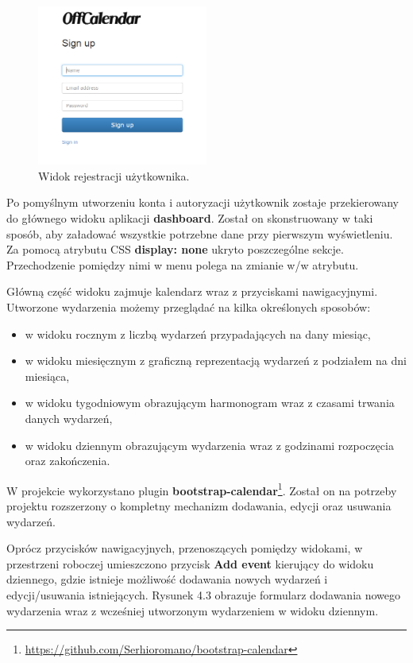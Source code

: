 \begin{figure}[H]
\centering
\includegraphics[width=0.5\textwidth]{register.png}
\caption{Widok rejestracji użytkownika.}
\end{figure}

Po pomyślnym utworzeniu konta i autoryzacji użytkownik zostaje przekierowany do głównego widoku aplikacji \textbf{dashboard}. Został on skonstruowany w taki sposób, aby załadować wszystkie potrzebne dane przy pierwszym wyświetleniu. Za pomocą atrybutu CSS \textbf{display: none} ukryto poszczególne sekcje. Przechodzenie pomiędzy nimi w menu polega na zmianie w/w atrybutu.

Główną część widoku zajmuje kalendarz wraz z przyciskami nawigacyjnymi. Utworzone wydarzenia możemy przeglądać na kilka określonych sposobów:

\begin{itemize}
\item w widoku rocznym z liczbą wydarzeń przypadających na dany miesiąc,
\item w widoku miesięcznym z graficzną reprezentacją wydarzeń z podziałem na dni miesiąca,
\item w widoku tygodniowym obrazującym harmonogram wraz z czasami trwania danych wydarzeń,
\item w widoku dziennym obrazującym wydarzenia wraz z godzinami rozpoczęcia oraz zakończenia.
\end{itemize}

W projekcie wykorzystano plugin \textbf{bootstrap-calendar}\footnote{\url{https://github.com/Serhioromano/bootstrap-calendar}}. Został on na potrzeby projektu rozszerzony o kompletny mechanizm dodawania, edycji oraz usuwania wydarzeń.

Oprócz przycisków nawigacyjnych, przenoszących pomiędzy widokami, w przestrzeni roboczej umieszczono przycisk \textbf{Add event} kierujący do widoku dziennego, gdzie istnieje możliwość dodawania nowych wydarzeń i edycji/usuwania istniejących. Rysunek 4.3 obrazuje formularz dodawania nowego wydarzenia wraz z wcześniej utworzonym wydarzeniem w widoku dziennym.

